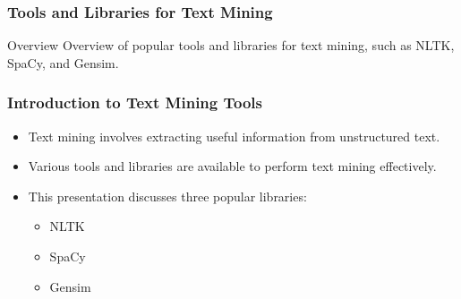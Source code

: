 \documentclass[aspectratio=169]{beamer}
\begin{document}
\begin{frame}
    \frametitle{Tools and Libraries for Text Mining}
    \begin{block}{Overview}
        Overview of popular tools and libraries for text mining, such as NLTK, SpaCy, and Gensim.
    \end{block}
\end{frame}

\begin{frame}
    \frametitle{Introduction to Text Mining Tools}
    \begin{itemize}
        \item Text mining involves extracting useful information from unstructured text.
        \item Various tools and libraries are available to perform text mining effectively.
        \item This presentation discusses three popular libraries:
            \begin{itemize}
                \item NLTK
                \item SpaCy
                \item Gensim
            \end{itemize}
    \end{itemize}
\end{frame}
\end{document}
